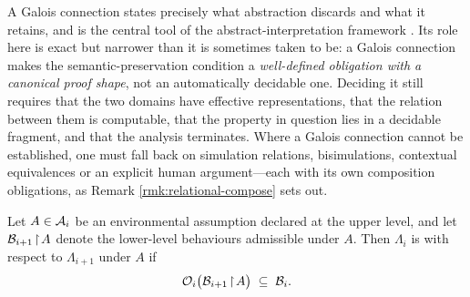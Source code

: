 A Galois connection states precisely what abstraction discards and what it retains, and is
the central tool of the abstract-interpretation framework \cite{cousot1977}. Its role here is
exact but narrower than it is sometimes taken to be: a Galois connection makes the
semantic-preservation condition a \emph{well-defined obligation with a canonical proof shape}, not
an automatically decidable one. Deciding it still requires that the two domains have effective
representations, that the relation between them is computable, that the property in question lies in
a decidable fragment, and that the analysis terminates. Where a Galois connection cannot be
established, one must fall back on simulation relations, bisimulations, contextual equivalences or
an explicit human argument---each with its own composition obligations, as Remark
\ref{rmk:relational-compose} sets out.

\begin{definition}\label{def:soundness}
Let $A \in \mathcal{A}_i$ be an environmental assumption declared at the upper level, and let
$\mathcal{B}_{i+1}\!\upharpoonright\! A$ denote the lower-level behaviours admissible under $A$.
Then $\Lambda_i$ is  with respect to $\Lambda_{i+1}$ under $A$ if
\begin{equation}\label{eq:soundness}
\mathcal{O}_i\bigl(\mathcal{B}_{i+1}\!\upharpoonright\! A\bigr) \;\subseteq\; \mathcal{B}_i .
\end{equation}
\end{definition}

